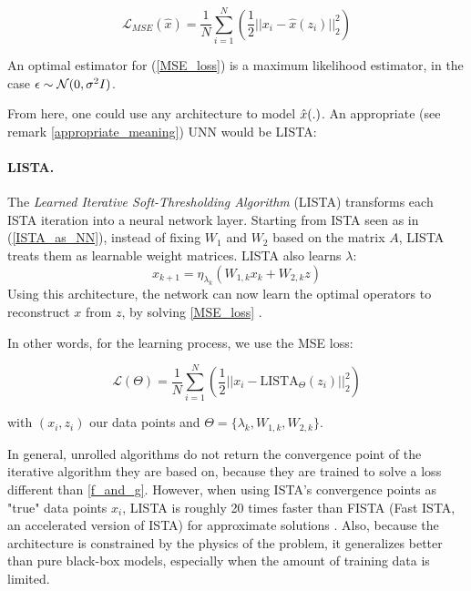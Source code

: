 \documentclass[a4paper,11pt]{article}
\theoremstyle{plain}{\theorembodyfont{\rmfamily}%
\newtheorem{proposition}[theorem]{Proposition}}
\theoremstyle{plain}{\theorembodyfont{\rmfamily}%
\newtheorem{notation}[theorem]{Notation}}
\theoremstyle{plain}{\theorembodyfont{\rmfamily}%
\newtheorem{assumption}[theorem]{Assumption}}
\theoremstyle{plain}{\theorembodyfont{\rmfamily}%
\newtheorem{problem}[theorem]{Problem}}
\theoremstyle{plain}{\theorembodyfont{\rmfamily}%
\newtheorem{example}[theorem]{Example}}
\theoremstyle{plain}{\theorembodyfont{\rmfamily}%
\newtheorem{remark}[theorem]{Remark}}
\theoremstyle{plain}{\theorembodyfont{\rmfamily}%
\newtheorem{definition}[theorem]{Definition}}
\theoremstyle{plain}{\theorembodyfont{\rmfamily}%
\newtheorem{question}[theorem]{Question}}
\numberwithin{equation}{section}
\begin{document}
\begin{equation}\label{MSE_loss}
    \mathcal{L}_{MSE}(\hat{x}) = \frac{1}{N}\sum_{i=1}^{N}\left( \frac{1}{2}||x_i - \hat{x}(z_i)||_2^2\right)
\end{equation}

\begin{remark}
An optimal estimator for (\ref{MSE_loss}) is a maximum likelihood estimator, in the case $\epsilon \sim {\ensuremath{\mathcal{N}}}(0,\sigma^2I)$.
\end{remark}

From here, one could use any architecture to model $\Hat{x}(.)$. An appropriate (see remark \ref{appropriate_meaning}) UNN would be LISTA:

\paragraph{LISTA.}
The \textit{Learned Iterative Soft-Thresholding Algorithm} (LISTA) \cite{gregor2010learning} transforms each ISTA iteration into a neural network layer. Starting from ISTA seen as in (\ref{ISTA_as_NN}), instead of fixing $W_1$ and $W_2$ based on the matrix $A$, LISTA treats them as learnable weight matrices. LISTA also learns $\lambda$:
\begin{equation}
    x_{k+1} = \eta_{\lambda_k} \left(W_{1,k} x_k +  W_{2,k} z \right)
\end{equation}
Using this architecture, the network can now learn the optimal operators to reconstruct $x$ from $z$, by solving \ref{MSE_loss} \cite{le2024unfolded}.

In other words, for the learning process, we use the MSE loss:

\begin{equation}
    \mathcal{L}(\Theta) = \frac{1}{N}\sum_{i=1}^{N}\left( \frac{1}{2}||x_i - \text{LISTA}_{\Theta}(z_i)||_2^2\right)
\end{equation}

with $(x_i,z_i)$ our data points and $\Theta = \{\lambda_k, W_{1,k}, W_{2,k}\}$.

In general, unrolled algorithms do not return the convergence point of the iterative algorithm they are based on, because they are trained to solve a loss different than \ref{f_and_g}. However, when using ISTA's convergence points as "true" data points $x_i$, LISTA is roughly 20 times faster than FISTA (Fast ISTA, an accelerated version of ISTA) for approximate solutions \cite{gregor2010learning}. Also, because the architecture is constrained by the physics of the problem, it generalizes better than pure black-box models, especially when the amount of training data is limited.
\end{document}
